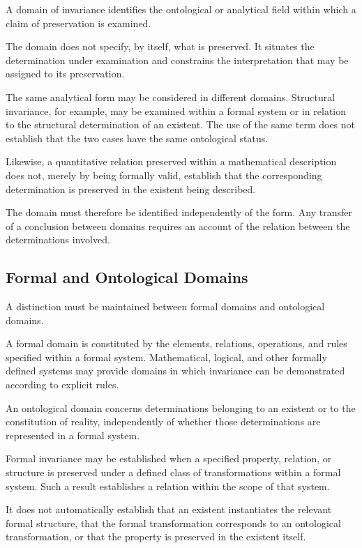 A domain of invariance identifies the ontological or
analytical field within which a claim of preservation
is examined.

The domain does not specify, by itself, what is preserved.
It situates the determination under examination and
constrains the interpretation that may be assigned
to its preservation.

The same analytical form may be considered in different
domains. Structural invariance, for example, may be
examined within a formal system or in relation to the
structural determination of an existent. The use of
the same term does not establish that the two cases
have the same ontological status.

Likewise, a quantitative relation preserved within
a mathematical description does not, merely by being
formally valid, establish that the corresponding
determination is preserved in the existent being
described.

The domain must therefore be identified independently
of the form. Any transfer of a conclusion between
domains requires an account of the relation between
the determinations involved.

\subsection{Formal and Ontological Domains}

A distinction must be maintained between formal
domains and ontological domains.

A formal domain is constituted by the elements,
relations, operations, and rules specified within
a formal system. Mathematical, logical, and other
formally defined systems may provide domains in
which invariance can be demonstrated according
to explicit rules.

An ontological domain concerns determinations
belonging to an existent or to the constitution
of reality, independently of whether those
determinations are represented in a formal system.

Formal invariance may be established when a specified
property, relation, or structure is preserved under
a defined class of transformations within a formal
system. Such a result establishes a relation within
the scope of that system.

It does not automatically establish that an existent
instantiates the relevant formal structure, that
the formal transformation corresponds to an
ontological transformation, or that the property
is preserved in the existent itself.


